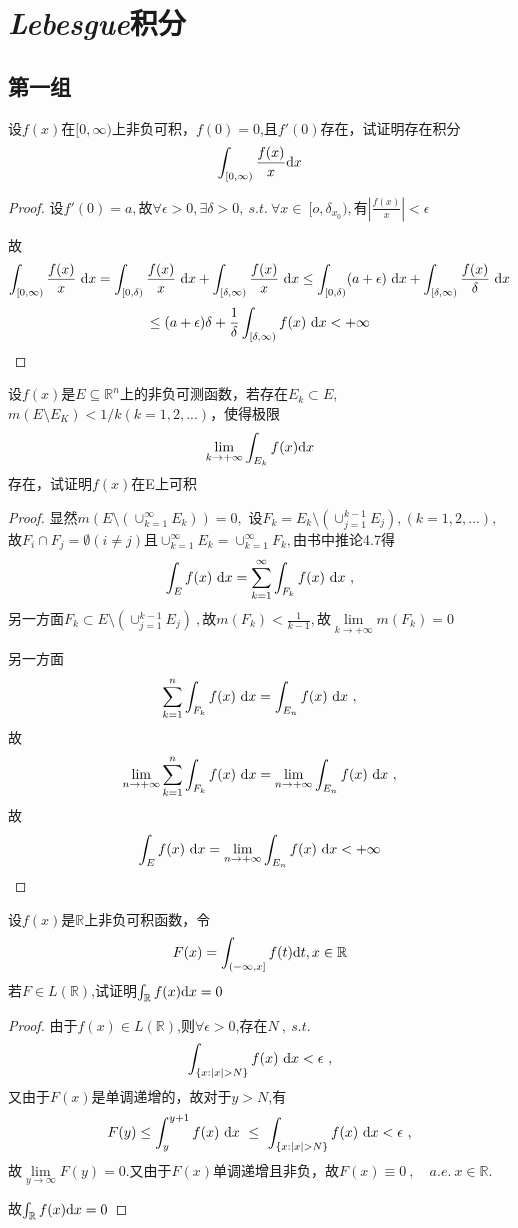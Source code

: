 \chapter{\emph{Lebesgue}积分}

\section{第一组}

设$f(x)$在$[0,\infty)$上非负可积，$f(0)=0$,且$f'(0)$存在，试证明存在积分$$\int_{[0,\infty)} \frac{f(x)}{x} \mathrm{d}x$$
\begin{proof}
设$f'(0)=a,$故$\forall \epsilon>0,\exists\delta>0,\ s.t. \ \forall x\in\ [o,\delta_{x_0}),$有$\left|\frac{f(x)}{x}\right|<\epsilon$\par 
故
$$\int_{[0,\infty)}\frac{f(x)}{x}\ \di{x}=\int_{[0,\delta)}\frac{f(x)}{x}\ \di{x}+\int_{[\delta,\infty)}\frac{f(x)}{x}\ \di{x}
\leq \int_{[0,\delta)}(a+\epsilon) \ \di{x}+\int_{[\delta,\infty)}\frac{f(x)}{\delta}\ \di{x}$$$$
\leq (a+\epsilon)\delta +\frac{1}{\delta}\int_{[\delta,\infty)}f(x)\ \di{x}<+\infty$$
\end{proof}



设$f(x)$是$E \subseteq \mathbb{R}^{n}$上的非负可测函数，若存在$E_k \subset E$,$m(E \setminus {E_K})<1/k(k=1,2,...)$，使得极限$$\lim\limits_{k \to +\infty} \int_{E_k} f(x) \mathrm{d}x $$存在，试证明$f(x)$在E上可积
\begin{proof}
显然$m\left(E\setminus (\cup_{k=1}^{\infty}E_k) \right)=0,$
设$F_k=E_k\setminus (\cup_{j=1}^{k-1}E_j),(k=1,2,...),$故$F_i\cap F_j=\emptyset(i\neq j)$且$\cup_{k=1}^{\infty}E_k=\cup_{k=1}^{\infty}F_k,$由书中推论4.7得$$\int_{E}f(x)\ \di{x}=\sum_{k=1}^{\infty}\int_{F_k}f(x)\ \di{x}\ ,$$另一方面$F_k\subset E\setminus\left(\cup_{j=1}^{k-1}E_j\right)\ ,$故$m(F_k)<\frac{1}{k-1},$故$\lim\limits_{k \to +\infty}m(F_k)=0$\par 
另一方面$$\sum_{k=1}^{n}\int_{F_k}f(x)\ \di{x}=\int_{E_n}f(x)\ \di{x}\ ,$$故$$\lim\limits_{n \to +\infty}\sum_{k=1}^{n}\int_{F_k}f(x)\ \mathrm{d}x=\lim\limits_{n \to +\infty}\int_{E_n}f(x)\ \mathrm{d}x\ ,$$故$$\int_{E}f(x)\ \mathrm{d}x=\lim\limits_{n \to +\infty}\int_{E_n}f(x)\ \mathrm{d}x<+\infty$$
\end{proof}


设$f(x)$是$\mathbb{R}$上非负可积函数，令$$F(x)=\int_{(-\infty,x]}f(t) \mathrm{d}t,  x\in \mathbb{R}$$
若$F \in L(\mathbb{R}) $,试证明$\int_{\mathbb{R}}f(x) \mathrm{d}x=0$
\begin{proof}
由于$f(x)\in L(\mathbb{R})$,则$\forall \epsilon>0$,存在$N\ ,\ s.t.\ $$$\int_{\{x:|x|>N\}}f(x)\ \di{x}<\epsilon\ ,$$又由于$F(x)$是单调递增的，故对于$y>N$,有$$F(y)\leq \int_{y}^{y+1}f(x)\ \di{x} \ \leq\ \int_{\{x:|x|>N\}}f(x)\ \di{x}<\epsilon\ ,$$故$\lim\limits_{y \to \infty}F(y)=0.$又由于$F(x)$单调递增且非负，故$F(x)\equiv 0\ ,\quad a.e. \ x \in \mathbb{R}.$\par 故$\int_{\mathbb{R}}f(x) \mathrm{d}x=0$
\end{proof}



